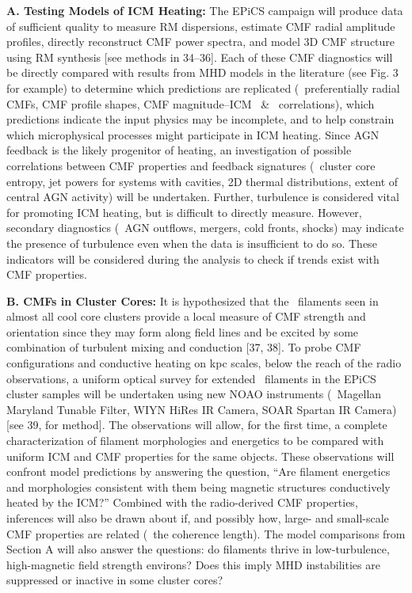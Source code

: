 \documentclass[12pt]{article}
\begin{document}
{\bf{A. Testing Models of ICM Heating:}} The EPiCS campaign will
produce data of sufficient quality to measure RM dispersions, estimate
CMF radial amplitude profiles, directly reconstruct CMF power spectra,
and model 3D CMF structure using RM synthesis [see methods in
  34--36]. Each of these CMF diagnostics will be directly compared
with results from MHD models in the literature (see Fig. 3 for
example) to determine which predictions are replicated
(\eg\ preferentially radial CMFs, CMF profile shapes, CMF
magnitude--ICM \nelec\ \& \tx\ correlations), which predictions
indicate the input physics may be incomplete, and to help constrain
which microphysical processes might participate in ICM heating. Since
AGN feedback is the likely progenitor of heating, an investigation of
possible correlations between CMF properties and feedback signatures
(\eg\ cluster core entropy, jet powers for systems with cavities, 2D
thermal distributions, extent of central AGN activity) will be
undertaken. Further, turbulence is considered vital for promoting ICM
heating, but is difficult to directly measure. However, secondary
diagnostics (\eg\ AGN outflows, mergers, cold fronts, shocks) may
indicate the presence of turbulence even when the data is insufficient
to do so. These indicators will be considered during the analysis to
check if trends exist with CMF properties.

{\bf{B. CMFs in Cluster Cores:}} It is hypothesized that the
\halpha\ filaments seen in almost all cool core clusters provide a
local measure of CMF strength and orientation since they may form
along field lines and be excited by some combination of turbulent
mixing and conduction [37, 38]. To probe CMF configurations and
conductive heating on kpc scales, below the reach of the radio
observations, a uniform optical survey for extended \halpha\ filaments
in the EPiCS cluster samples will be undertaken using new NOAO
instruments (\ie\ Magellan Maryland Tunable Filter, WIYN HiRes IR
Camera, SOAR Spartan IR Camera) [see 39, for method]. The observations
will allow, for the first time, a complete characterization of
filament morphologies and energetics to be compared with uniform ICM
and CMF properties for the same objects. These observations will
confront model predictions by answering the question, ``Are filament
energetics and morphologies consistent with them being magnetic
structures conductively heated by the ICM?''  Combined with the
radio-derived CMF properties, inferences will also be drawn about if,
and possibly how, large- and small-scale CMF properties are related
(\eg\ the coherence length). The model comparisons from Section A will
also answer the questions: do filaments thrive in low-turbulence,
high-magnetic field strength environs? Does this imply MHD
instabilities are suppressed or inactive in some cluster cores?
\end{document}
